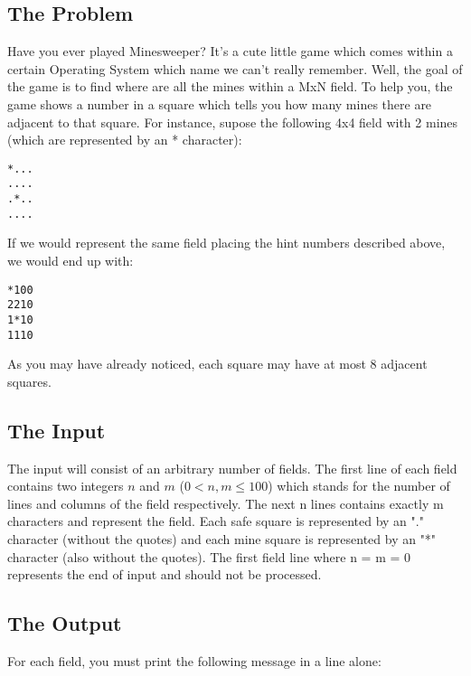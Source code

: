  

\subsection*{The Problem}

Have you ever played Minesweeper? It's a cute little game which comes within a certain 
Operating System which name we can't really remember. Well, the goal of the game is to
find where are all the mines within a MxN field. To help you, the game shows a number
in a square which tells you how many mines there are adjacent to that square. For instance,
supose the following 4x4 field with 2 mines (which are represented by an * character):

\begin{verbatim}
*...
....
.*..
....
\end{verbatim}

If we would represent the same field placing the hint numbers described above, we would end up with:

\begin{verbatim}
*100
2210
1*10
1110
\end{verbatim}

As you may have already noticed, each square may have at most 8 adjacent squares.

\subsection*{The Input}

The input will consist of an arbitrary number of fields. The first line of each field contains
two integers $n$ and $m$ ($0 < n,m \leqslant 100$) which stands for the number of lines and columns of the field
respectively. The next n lines contains exactly m characters and represent the field. Each safe
square is represented by an "." character (without the quotes) and each mine square is represented
by an "*" character (also without the quotes). The first field line where n = m = 0 represents the end 
of input and should not be processed.

\subsection*{The Output}

For each field, you must print the following message in a line alone:

